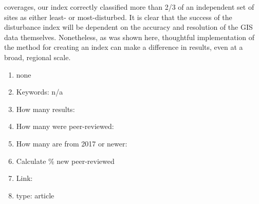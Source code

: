 \documentclass{article}
\begin{document}
\begin{enumerate}
coverages, our index correctly classified more than 2/3 of an independent set of sites as either least- or most-disturbed. It is clear that the success of the disturbance index will be dependent on the accuracy and resolution of the GIS data themselves. Nonetheless, as was shown here, thoughtful implementation of the method for creating an index can make a difference in results, even at a broad, regional scale.
        \begin{enumerate}
            \item none 
            \item Keywords: n/a 
            \item How many results:  
            \item How many were peer-reviewed: 
            \item How many are from 2017 or newer: 
            \item Calculate \% new peer-reviewed 
            \item Link: 
            \item type: article 
        \end{enumerate}
    
    

\end{enumerate}
\end{document}
